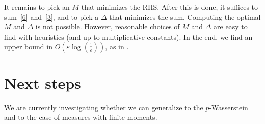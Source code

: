 \documentclass[12pt]{report}
\theoremstyle{definition}
\theoremstyle{remark}
\begin{document}
It remains to pick an $M$ that minimizes the RHS. After this is done, it suffices to sum~\eqref{6} and~\eqref{3}, and to pick a $\Delta$ that minimizes the sum. Computing the optimal $M$ and $\Delta$ is not possible. However, reasonable choices of $M$ and $\Delta$ are easy to find with heuristics (and up to multiplicative constants). In the end, we find an upper bound in $O\left(\varepsilon \log\left(\frac 1\varepsilon \right)\right)$, as in \cite{genevay2018sample}.

\section{Next steps}

\hspace{\parindent} We are currently investigating whether we can generalize \cite{mena2019statistical} to the $p$-Wasserstein and to the case of measures with finite moments.

\newpage 


\end{document}
